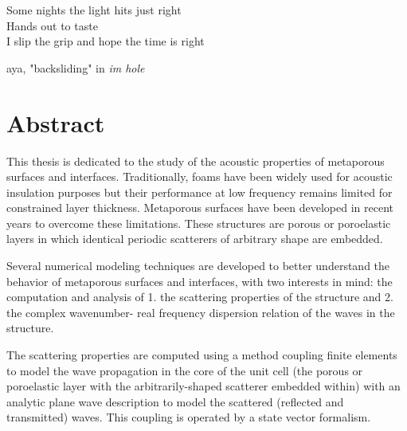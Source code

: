 \newpage
\thispagestyle{empty}
\vspace*{5.5cm}
\begin{flushright}
    \epigraph{
        Some nights the light hits just right\\
        Hands out to taste\\
        I slip the grip and hope the time is right
    }{aya, "backsliding" in \emph{im hole}}
\end{flushright}   
\newpage

\begingroup
{}
\chapter*{Abstract}
\vspace*{2cm}
This thesis is dedicated to the study of the acoustic properties of metaporous surfaces and interfaces. Traditionally, foams have been widely used for acoustic insulation purposes but their performance at low frequency remains limited for constrained layer thickness. Metaporous surfaces have been developed in recent years to overcome these limitations. These structures are porous or poroelastic layers in which identical periodic scatterers of arbitrary shape are embedded.

Several numerical modeling techniques are developed to better understand the behavior of metaporous surfaces and interfaces, with two interests in mind: the computation and analysis of 1. the scattering properties of the structure and 2. the complex wavenumber- real frequency dispersion relation of the waves in the structure. 

The scattering properties are computed using a method coupling finite elements to model the wave propagation in the core of the unit cell (the porous or poroelastic layer with the arbitrarily-shaped scatterer embedded within) with an analytic plane wave description to model the scattered (reflected and transmitted) waves. This coupling is operated by
a state vector formalism.


